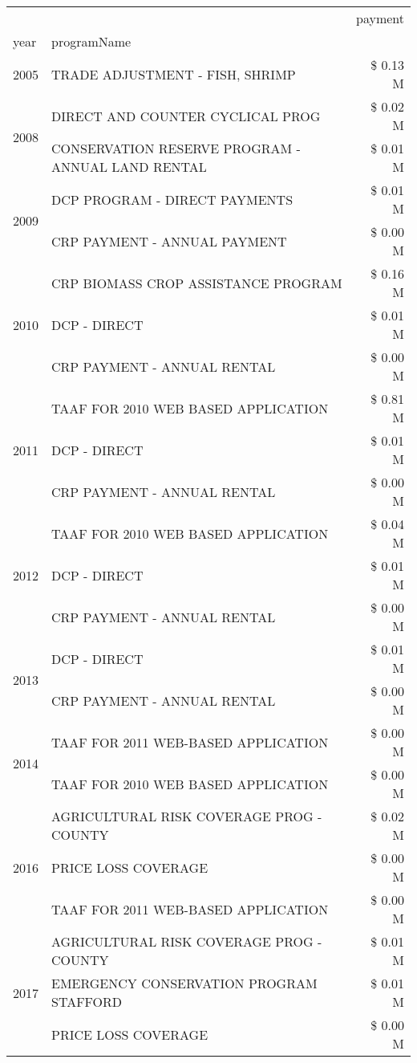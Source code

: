 \begin{tabular}{llr}
\toprule
 &  & payment \\
year & programName &  \\
\midrule
2005 & TRADE ADJUSTMENT - FISH, SHRIMP & \$ 0.13 M \\
\cline{1-3}
\multirow[t]{2}{*}{2008} & DIRECT AND COUNTER CYCLICAL PROG & \$ 0.02 M \\
 & CONSERVATION RESERVE PROGRAM - ANNUAL LAND RENTAL & \$ 0.01 M \\
\cline{1-3}
\multirow[t]{2}{*}{2009} & DCP PROGRAM - DIRECT PAYMENTS & \$ 0.01 M \\
 & CRP PAYMENT - ANNUAL PAYMENT & \$ 0.00 M \\
\cline{1-3}
\multirow[t]{3}{*}{2010} & CRP BIOMASS CROP ASSISTANCE PROGRAM & \$ 0.16 M \\
 & DCP - DIRECT & \$ 0.01 M \\
 & CRP PAYMENT - ANNUAL RENTAL & \$ 0.00 M \\
\cline{1-3}
\multirow[t]{3}{*}{2011} & TAAF FOR 2010 WEB BASED APPLICATION & \$ 0.81 M \\
 & DCP - DIRECT & \$ 0.01 M \\
 & CRP PAYMENT - ANNUAL RENTAL & \$ 0.00 M \\
\cline{1-3}
\multirow[t]{3}{*}{2012} & TAAF FOR 2010 WEB BASED APPLICATION & \$ 0.04 M \\
 & DCP - DIRECT & \$ 0.01 M \\
 & CRP PAYMENT - ANNUAL RENTAL & \$ 0.00 M \\
\cline{1-3}
\multirow[t]{2}{*}{2013} & DCP - DIRECT & \$ 0.01 M \\
 & CRP PAYMENT - ANNUAL RENTAL & \$ 0.00 M \\
\cline{1-3}
\multirow[t]{2}{*}{2014} & TAAF FOR 2011 WEB-BASED APPLICATION & \$ 0.00 M \\
 & TAAF FOR 2010 WEB BASED APPLICATION & \$ 0.00 M \\
\cline{1-3}
\multirow[t]{3}{*}{2016} & AGRICULTURAL RISK COVERAGE PROG - COUNTY & \$ 0.02 M \\
 & PRICE LOSS COVERAGE & \$ 0.00 M \\
 & TAAF FOR 2011 WEB-BASED APPLICATION & \$ 0.00 M \\
\cline{1-3}
\multirow[t]{3}{*}{2017} & AGRICULTURAL RISK COVERAGE PROG - COUNTY & \$ 0.01 M \\
 & EMERGENCY CONSERVATION PROGRAM STAFFORD & \$ 0.01 M \\
 & PRICE LOSS COVERAGE & \$ 0.00 M \\

\end{tabular}
